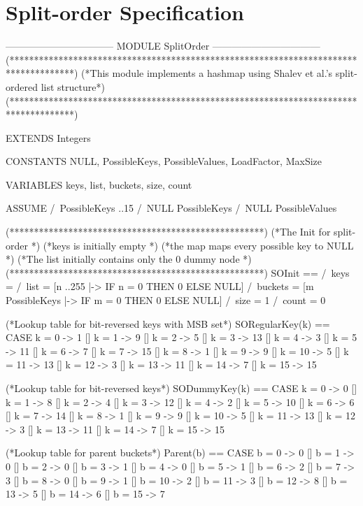 \documentclass{uit-thesis}
\begin{document}
\chapter{Split-order Specification}\label{appendix:specification}
    \begin{tla}
        --------------------------------- MODULE SplitOrder ---------------------------------
        (*************************************************************************************)
        (*This module implements a hashmap using Shalev et al.'s split-ordered list structure*)
        (*************************************************************************************)
        
        EXTENDS Integers
        
        CONSTANTS NULL, PossibleKeys, PossibleValues, LoadFactor, MaxSize
        
        VARIABLES keys, list, buckets, size, count
        
        ASSUME
        /\ PossibleKeys ..15
        /\ NULL \notin PossibleKeys
        /\ NULL \notin PossibleValues
        
        (****************************************************)
        (*The Init for split-order                          *)
        (*keys is initially empty                           *)
        (*the map maps every possible key to NULL           *)
        (*The list initially contains only the 0 dummy node *)
        (****************************************************)
SOInit ==   /\ keys = {}
/\ list = [n ..255 |-> IF n = 0 THEN 0 ELSE NULL]
/\ buckets = [m \in PossibleKeys |-> IF m = 0 THEN 0 ELSE NULL]
/\ size = 1
/\ count = 0

(*Lookup table for bit-reversed keys with MSB set*)
SORegularKey(k) ==  CASE k = 0 -> 1
[] k = 1 -> 9
[] k = 2 -> 5
[] k = 3 -> 13
[] k = 4 -> 3
[] k = 5 -> 11
[] k = 6 -> 7
[] k = 7 -> 15
[] k = 8 -> 1
[] k = 9 -> 9
[] k = 10 -> 5
[] k = 11 -> 13
[] k = 12 -> 3
[] k = 13 -> 11
[] k = 14 -> 7
[] k = 15 -> 15

(*Lookup table for bit-reversed keys*)
SODummyKey(k) ==    CASE k = 0 -> 0
[] k = 1 -> 8
[] k = 2 -> 4
[] k = 3 -> 12
[] k = 4 -> 2
[] k = 5 -> 10
[] k = 6 -> 6
[] k = 7 -> 14
[] k = 8 -> 1
[] k = 9 -> 9
[] k = 10 -> 5
[] k = 11 -> 13
[] k = 12 -> 3
[] k = 13 -> 11
[] k = 14 -> 7
                     [] k = 15 -> 15
                     
                     (*Lookup table for parent buckets*)
                     Parent(b) ==    CASE b = 0 -> 0
                     [] b = 1 -> 0
                     [] b = 2 -> 0
                     [] b = 3 -> 1
                     [] b = 4 -> 0
                     [] b = 5 -> 1
                     [] b = 6 -> 2
                     [] b = 7 -> 3
                     [] b = 8 -> 0
                     [] b = 9 -> 1
                     [] b = 10 -> 2
                     [] b = 11 -> 3
                     [] b = 12 -> 8
                     [] b = 13 -> 5
                     [] b = 14 -> 6
                     [] b = 15 -> 7
                     

\end{tla}
\end{document}
